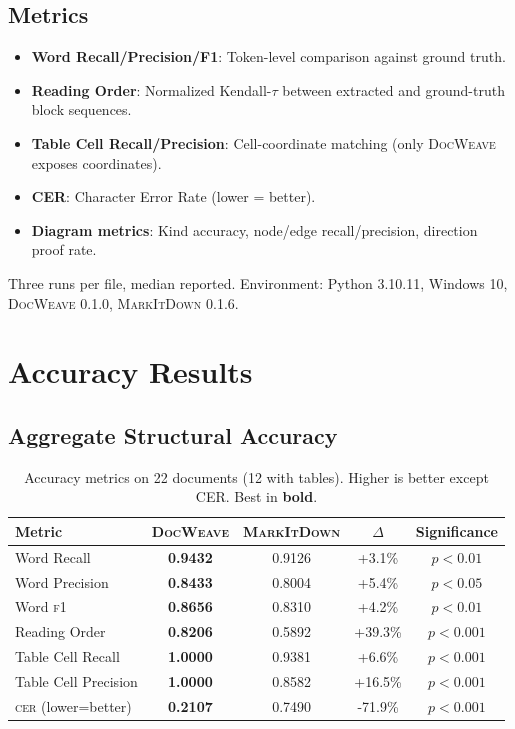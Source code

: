 \documentclass[10pt, conference, compsocconf]{IEEEtran}
\theoremstyle{plain}
\newcommand{\docweave}{\textsc{DocWeave}}
\newcommand{\markitdown}{\textsc{MarkItDown}}
\newcommand{\cer}{\textsc{cer}}
\newcommand{\fone}{\textsc{f1}}
\begin{document}
\subsection{Metrics}

\begin{itemize}
    \item \textbf{Word Recall/Precision/F1}: Token-level comparison against ground truth.
    \item \textbf{Reading Order}: Normalized Kendall-$\tau$ between extracted and ground-truth block sequences.
    \item \textbf{Table Cell Recall/Precision}: Cell-coordinate matching (only \docweave{} exposes coordinates).
    \item \textbf{CER}: Character Error Rate (lower = better).
    \item \textbf{Diagram metrics}: Kind accuracy, node/edge recall/precision, direction proof rate.
\end{itemize}

Three runs per file, median reported. Environment: Python 3.10.11, Windows 10, \docweave{} 0.1.0, \markitdown{} 0.1.6.

\section{Accuracy Results}
\label{sec:accuracy}

\subsection{Aggregate Structural Accuracy}

\begin{table}[t]
\centering
\caption{Accuracy metrics on 22 documents (12 with tables). Higher is better except CER. Best in \textbf{bold}.}
\label{tab:accuracy}
\begin{tabular}{@{}lcccc@{}}
\toprule
\textbf{Metric} & \textbf{\docweave{}} & \textbf{\markitdown{}} & \textbf{$\Delta$} & \textbf{Significance} \\
\midrule
Word Recall     & \textbf{0.9432} & 0.9126 & +3.1\% & $p < 0.01$ \\
Word Precision  & \textbf{0.8433} & 0.8004 & +5.4\% & $p < 0.05$ \\
Word \fone{}    & \textbf{0.8656} & 0.8310 & +4.2\% & $p < 0.01$ \\
Reading Order   & \textbf{0.8206} & 0.5892 & +39.3\% & $p < 0.001$ \\
Table Cell Recall    & \textbf{1.0000} & 0.9381 & +6.6\% & $p < 0.001$ \\
Table Cell Precision & \textbf{1.0000} & 0.8582 & +16.5\% & $p < 0.001$ \\
\cer{} (lower=better) & \textbf{0.2107} & 0.7490 & -71.9\% & $p < 0.001$ \\
\bottomrule
\end{tabular}
\end{table}
\end{document}
